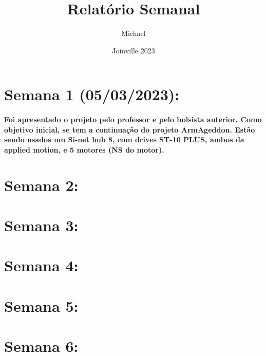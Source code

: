 \documentclass{article}
\title{Relatório Semanal}
\author{Michael}
\date{Joinville 2023}
\begin{document}
\maketitle

\newpage
\section{Semana 1 (05/03/2023):}
\paragraph{Foi apresentado o projeto pelo professor e pelo bolsista anterior. Como objetivo inicial, se tem a continuação do projeto ArmAgeddon. Estão sendo usados um Si-net hub 8, com drives ST-10 PLUS, ambos da applied motion, e 5 motores (NS do motor). }

\newpage
\section{Semana 2:}
\paragraph{}

\newpage
\section{Semana 3:}
\paragraph{}

\newpage
\section{Semana 4:}
\paragraph{}

\newpage
\section{Semana 5:}
\paragraph{}

\newpage
\section{Semana 6:}
\end{document}

